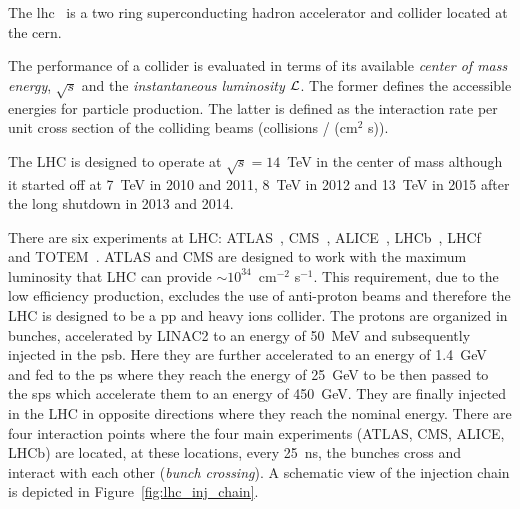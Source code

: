 The \gls{lhc}~\cite{LHC} is a two ring superconducting hadron accelerator and
collider located at the \gls{cern}.

The performance of a collider is evaluated in terms of its available
\emph{center of mass energy}, $\sqrt{s}$ and the \emph{instantaneous luminosity}
$\mathcal{L}$. The former defines the accessible energies for particle production. The
latter is defined as the interaction rate per unit cross section of the
colliding beams (collisions / (cm$^2$ s)).

The LHC is designed to operate at $\sqrt{s} = 14$~TeV in the center of mass
although it started off at 7~TeV in 2010 and 2011, 8~TeV in 2012 and 13~TeV in
2015 after the long shutdown in 2013 and 2014.

There are six experiments at LHC: ATLAS~\cite{ATLASPaper},
CMS~\cite{1748-0221-3-08-S08004}, ALICE~\cite{ALICE}, LHCb~\cite{LHCb},
LHCf~\cite{LHCf} and TOTEM~\cite{TOTEM}\@. ATLAS and CMS are designed to work
with the maximum luminosity that LHC can provide $\sim 10^{34}$~cm$^{-2}$
s$^{-1}$. This requirement, due to the low efficiency production, excludes the
use of anti-proton beams and therefore the LHC is designed to be a \gls{pp} and
heavy ions collider. The protons are organized in bunches, accelerated by LINAC2
to an energy of 50~MeV and subsequently injected in the \gls{psb}. Here they are
further accelerated to an energy of 1.4~GeV and fed to the \gls{ps} where they
reach the energy of 25~GeV to be then passed to the \gls{sps} which accelerate
them to an energy of 450~GeV. They are finally injected in the LHC in opposite
directions where they reach the nominal energy. There are four interaction
points where the four main experiments (ATLAS, CMS, ALICE, LHCb) are located, at
these locations, every 25~ns, the bunches cross and interact with each other
(\emph{bunch crossing}). A schematic view of the injection chain is depicted in
Figure~\ref{fig:lhc_inj_chain}.

